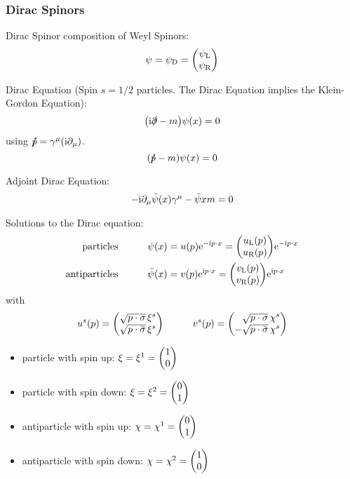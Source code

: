 		\subsubsection{Dirac Spinors}
			Dirac Spinor composition of Weyl Spinors:
			\begin{equation}
				\psi = \psi_\text{D} = \mqty(\psi_\text{L} \\ \psi_\text{R})
			\end{equation}
			
			\noindent
			Dirac Equation (Spin $s=1/2$ particles. The Dirac Equation implies the Klein-Gordon Equation):
			\begin{equation}
				\qty(\mathrm{i}\slashed{\partial} - m ) \psi\qty(x) = 0
			\end{equation}
			using $\slashed{\hat{p}} = \gamma^\mu(\mathrm{i}\partial_\mu)$.
			\begin{equation}
				\qty(\slashed{\hat{p}} - m) \psi\qty(x) = 0
			\end{equation}

			\noindent
			Adjoint Dirac Equation:
			\begin{equation}
				-\mathrm{i} \partial_\mu \bar{\psi}(x)\gamma^\mu-\bar\psi{x}m = 0
			\end{equation}

			\noindent
			Solutions to the Dirac equation:
			\begin{equation}
				\begin{aligned}
					\text{particles} & \hsp
					\psi(x) = u(p) \ex^{-\i p \cdot x} = \mqty(
						u_\text{L}(p) \\
						u_\text{R}(p)
						) \ex^{-\i p \cdot x} \\
					\text{antiparticles} & \hsp
					\bar{\psi}(x) = v(p) \ex^{\i p \cdot x} = \mqty(
						v_\text{L}(p) \\
						v_\text{R}(p)
						) \ex^{\i p \cdot x}
				\end{aligned}
			\end{equation}
			with
			\begin{equation}
				u^s(p) = \mqty(
					\sqrt{p\cdot\sigma}\,\xi^s \\
					\sqrt{p\cdot\bar{\sigma}}\,\xi^s
					)
				\hsp v^s(p) = \mqty(
					\M\sqrt{p\cdot\sigma}\,\chi^s \\
					-\sqrt{p\cdot\bar{\sigma}}\,\chi^s
				)
			\end{equation}
			\begin{itemize}
				\item particle with spin up: $\xi=\xi^1=\mqty(1\\0)$
				\item particle with spin down: $\xi=\xi^2=\mqty(0\\1)$
				\item antiparticle with spin up: $\chi=\chi^1=\mqty(0\\1)$
				\item antiparticle with spin down: $\chi=\chi^2=\mqty(1\\0)$
			\end{itemize}

